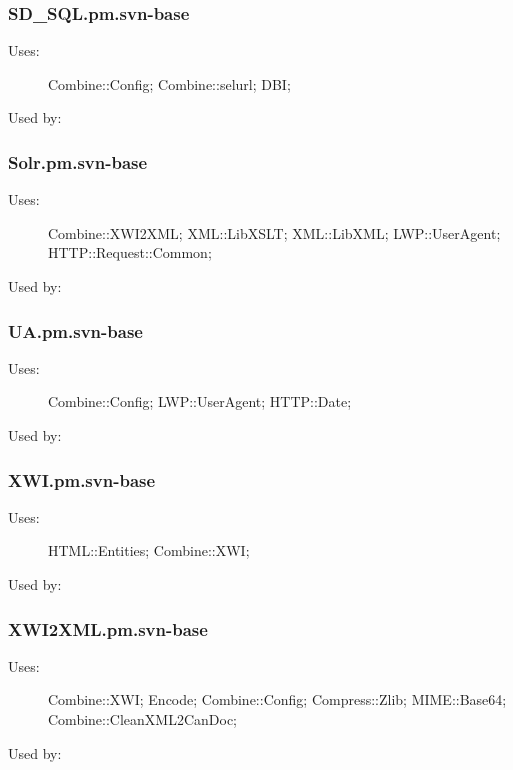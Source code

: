 \subsubsection{SD\_SQL.pm.svn-base}
\begin{description}
\item[Uses:] Combine::Config; Combine::selurl; DBI; 

\item[Used by:] 

\end{description}
\subsubsection{Solr.pm.svn-base}
\begin{description}
\item[Uses:] Combine::XWI2XML; XML::LibXSLT; XML::LibXML; LWP::UserAgent; HTTP::Request::Common; 

\item[Used by:] 

\end{description}
\subsubsection{UA.pm.svn-base}
\begin{description}
\item[Uses:] Combine::Config; LWP::UserAgent; HTTP::Date; 

\item[Used by:] 

\end{description}
\subsubsection{XWI.pm.svn-base}
\begin{description}
\item[Uses:] HTML::Entities; Combine::XWI; 

\item[Used by:] 

\end{description}
\subsubsection{XWI2XML.pm.svn-base}
\begin{description}
\item[Uses:] Combine::XWI; Encode; Combine::Config; Compress::Zlib; MIME::Base64; Combine::CleanXML2CanDoc; 

\item[Used by:] 

\end{description}
